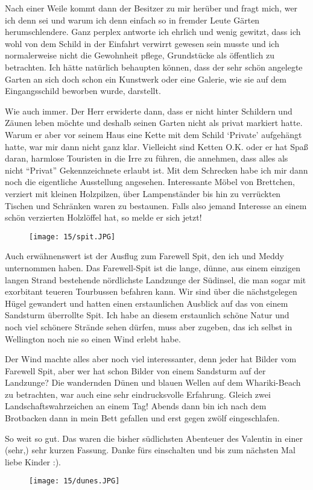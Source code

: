 Nach einer Weile kommt dann der Besitzer zu mir
herüber und fragt mich, wer ich denn sei und warum ich denn einfach so
in fremder Leute Gärten herumschlendere. Ganz perplex antworte ich
ehrlich und wenig gewitzt, dass ich wohl von dem Schild in der Einfahrt
verwirrt gewesen sein musste und ich normalerweise nicht die Gewohnheit
pflege, Grundstücke als öffentlich zu betrachten. Ich hätte natürlich
behaupten können, dass der sehr schön angelegte Garten an sich doch
schon ein Kunstwerk oder eine Galerie, wie sie auf dem Eingangsschild
beworben wurde, darstellt.

Wie auch immer. Der Herr erwiderte dann, dass er nicht hinter
Schildern und Zäunen leben möchte und deshalb seinen Garten nicht als
privat markiert hatte. Warum er aber vor seinem Haus eine Kette mit
dem Schild `Private' aufgehängt hatte, war mir dann nicht ganz
klar. Vielleicht sind Ketten O.K. oder er hat Spaß daran, harmlose
Touristen in die Irre zu führen, die annehmen, dass alles als nicht
``Privat'' Gekennzeichnete erlaubt ist. Mit dem Schrecken habe ich mir
dann noch die eigentliche Ausstellung angesehen. Interessante Möbel
von Brettchen, verziert mit kleinen Holzpilzen, über Lampenständer bis
hin zu verrückten Tischen und Schränken waren zu bestaunen. Falls also
jemand Interesse an einem schön verzierten Holzlöffel hat, so melde er
sich jetzt!

\begin{figure}[h]
  \centering
  \texttt{[image: 15/spit.JPG]}
\end{figure}
Auch erwähnenswert ist der Ausflug zum Farewell Spit, den ich und Meddy
unternommen haben. Das Farewell-Spit ist die lange, dünne, aus einem
einzigen langen Strand bestehende nördlichste Landzunge der Südinsel,
die man sogar mit exorbitant teueren Tourbussen befahren kann. Wir sind
über die nächstgelegen Hügel gewandert und hatten einen erstaunlichen
Ausblick auf das von einem Sandsturm überrollte Spit. Ich habe an diesem
erstaunlich schöne Natur und noch viel schönere Strände sehen dürfen,
muss aber zugeben, das ich selbst in Wellington noch nie so einen Wind
erlebt habe.

Der Wind machte alles aber noch viel interessanter, denn
jeder hat Bilder vom Farewell Spit, aber wer hat schon Bilder von einem
Sandsturm auf der Landzunge? Die wandernden Dünen und blauen Wellen auf
dem Whariki-Beach zu betrachten, war auch eine sehr eindrucksvolle
Erfahrung. Gleich zwei Landschaftswahrzeichen an einem Tag! Abends dann
bin ich nach dem Brotbacken dann in mein Bett gefallen und erst gegen
zwölf eingeschlafen.

So weit so gut. Das waren die bisher südlichsten Abenteuer des Valentin
in einer (sehr,) sehr kurzen Fassung. Danke fürs einschalten und bis zum
nächsten Mal liebe Kinder :).

\begin{figure}[h]
  \centering
  \texttt{[image: 15/dunes.JPG]}
\end{figure}
